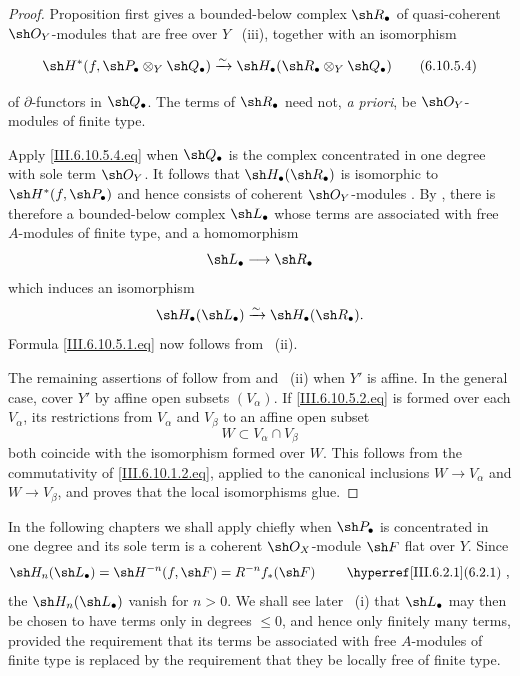 \begin{proof}
Proposition  first gives a bounded-below
complex $\sh R_\bullet$  of quasi-coherent
$\sh O_Y$-modules that are free over $Y$
~(iii), together with an isomorphism
\begin{env}[6.10.5.4]
\label{III.6.10.5.4}
\[
  \sh H^*
  (f,\sh P_\bullet\otimes_Y\sh Q_\bullet)
  \xrightarrow{\sim}
  \sh H_\bullet
  (\sh R_\bullet\otimes_Y\sh Q_\bullet)
  \tag{6.10.5.4}\label{III.6.10.5.4.eq}
\]
\end{env}
of $\partial$-functors in $\sh Q_\bullet$.  The terms of
$\sh R_\bullet$ need not, \emph{a priori}, be
$\sh O_Y$-modules of finite type.

Apply \eqref{III.6.10.5.4.eq} when $\sh Q_\bullet$ is the
complex concentrated in one degree with sole term $\sh O_Y$.
It follows that $\sh H_\bullet(\sh R_\bullet)$ is isomorphic to
$\sh H^*(f,\sh P_\bullet)$ and hence consists of coherent
$\sh O_Y$-modules .  By
, there is therefore a bounded-below complex
$\sh L_\bullet$ whose terms are associated with free
$A$-modules of finite type, and a homomorphism
\[
  \sh L_\bullet\longrightarrow\sh R_\bullet
\]
which induces an isomorphism
\[
  \sh H_\bullet(\sh L_\bullet)
  \xrightarrow{\sim}
  \sh H_\bullet(\sh R_\bullet).
\]
Formula \eqref{III.6.10.5.1.eq} now follows from
~(ii).

The remaining assertions of  follow from
 and ~(ii) when $Y'$ is
affine.  In the general case, cover $Y'$ by affine open subsets
$(V_\alpha)$.  If
\eqref{III.6.10.5.2.eq} is formed over each $V_\alpha$, its
restrictions from $V_\alpha$ and $V_\beta$ to an affine open
subset
\[
  W\subset V_\alpha\cap V_\beta
\]
both coincide with the isomorphism formed over $W$.  This
follows from the commutativity of
\eqref{III.6.10.1.2.eq}, applied to the canonical inclusions
$W\to V_\alpha$ and $W\to V_\beta$, and proves that the local
isomorphisms glue.
\end{proof}

\begin{remark}[6.10.6]
\label{III.6.10.6}
In the following chapters we shall apply 
chiefly when $\sh P_\bullet$ is concentrated in one degree and
its sole term is a coherent $\sh O_X$-module $\sh F$ flat over
$Y$.  Since
\[
  \sh H_n(\sh L_\bullet)
  =
  \sh H^{-n}(f,\sh F)
  =
  R^{-n}f_*(\sh F)
  \qquad\text{\sref{III.6.2.1}},
\]
the $\sh H_n(\sh L_\bullet)$ vanish for $n>0$.  We shall see
later ~(i) that $\sh L_\bullet$ may then be
chosen to have terms only in degrees $\leq0$, and hence only
finitely many terms, provided the requirement that its terms
be associated with free $A$-modules of finite type is replaced
by the requirement that they be locally free of finite type.
\end{remark}

